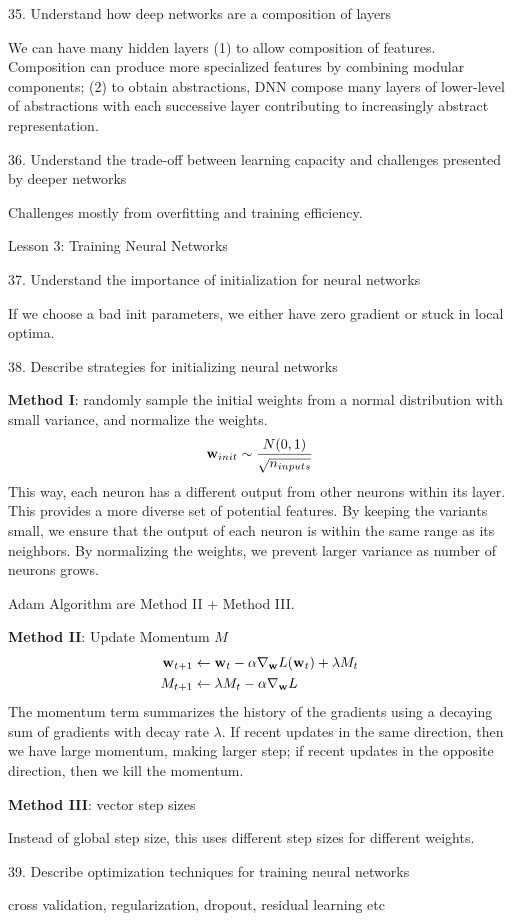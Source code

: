 \documentclass[sutton_barto_notes.tex]{subfiles}
\begin{document}
35. Understand how deep networks are a composition of layers 

We can have many hidden layers (1) to allow composition of features. Composition can produce more specialized features by combining modular components; (2) to obtain abstractions, DNN compose many layers of lower-level of abstractions with each successive layer contributing to increasingly abstract representation.

36. Understand the trade-off between learning capacity and challenges presented by deeper networks 

Challenges mostly from overfitting and training efficiency.

Lesson 3: Training Neural Networks 

37. Understand the importance of initialization for neural networks 

If we choose a bad init parameters, we either have zero gradient or stuck in local optima.

38. Describe strategies for initializing neural networks 

\textbf{Method I}: randomly sample the initial weights from a normal distribution with small variance, and normalize the weights.
$${\operatorname*{\mathbf{w}}}_{init}\sim \frac{N(0,1)}{\sqrt{n_{inputs}}}$$
This way, each neuron has a different output from other neurons within its layer. This provides a more diverse set of potential features. By keeping the variants small, we ensure that the output of each neuron is within the same range as its neighbors. By normalizing the weights, we prevent larger variance as number of neurons grows.

Adam Algorithm are Method II + Method III.

\textbf{Method II}: Update Momentum $M$
\begin{align*}
{\operatorname*{\mathbf{w}}}_{t+1} &\leftarrow {\operatorname*{\mathbf{w}}}_t - \alpha \nabla_{{\operatorname*{\mathbf{w}}}}L({\operatorname*{\mathbf{w}}}_t)+\lambda M_t \\
M_{t+1} &\leftarrow \lambda M_t - \alpha \nabla_{{\operatorname*{\mathbf{w}}}}L
\end{align*}
The momentum term summarizes the history of the gradients using a decaying sum of gradients with decay rate $\lambda$. If recent updates in the same direction, then we have large momentum, making larger step; if recent updates in the opposite direction, then we kill the momentum.

\textbf{Method III}: vector step sizes

Instead of global step size, this uses different step sizes for different weights.

39. Describe optimization techniques for training neural networks

cross validation, regularization, dropout, residual learning etc
\end{document}
